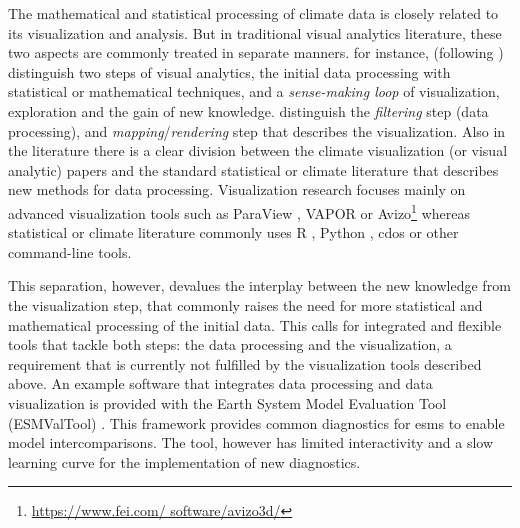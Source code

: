 \begin{refsection}
The mathematical and statistical processing of climate data is closely related to its visualization and analysis. But in traditional visual analytics literature, these two aspects are commonly treated in separate manners. \cite{KeimAndrienkoFeketeEtAl2008} for instance, (following \cite{Wijk2005}) distinguish two steps of visual analytics, the initial data processing with statistical or mathematical techniques, and a \textit{sense-making loop} of visualization, exploration and the gain of new knowledge. \cite{BoettingerRoeber2019} distinguish the \textit{filtering} step (data processing), and \textit{mapping}/\textit{rendering} step that describes the visualization. Also in the literature there is a clear division between the climate visualization (or visual analytic) papers and the standard statistical or climate literature that describes new methods for data processing. Visualization research focuses mainly on advanced visualization tools such as ParaView \citep{Ayachit2015}, VAPOR \citep{ClyneMininniNortonEtAl2007} or Avizo\footnote{\url{https://www.fei.com/
software/avizo3d/}} \citep[e.g.][]{RautenhausBoettingerSiemenEtAl2018, NockeBuschmannDongesEtAl2015, WongShenLeungEtAl2014, BoettingerRoeber2019} whereas statistical or climate literature commonly uses R \citep{RCT2019}, Python \citep{Oliphant2006, PerezGrangerHunter2011}, \glspl{cdo} \citep{Schulzweida2019} or other command-line tools.

This separation, however, devalues the interplay between the new knowledge from the visualization step, that commonly raises the need for more statistical and mathematical processing of the initial data. This calls for integrated and flexible tools that tackle both steps: the data processing and the visualization, a requirement that is currently not fulfilled by the visualization tools described above. An example software that integrates data processing and data visualization is provided with the Earth System Model Evaluation Tool (ESMValTool) \citep{EyringRighiLauerEtAl2016}. This framework provides common diagnostics for \glspl{esm} to enable model intercomparisons. The tool, however has limited interactivity and a slow learning curve for the implementation of new diagnostics.


\end{refsection}
